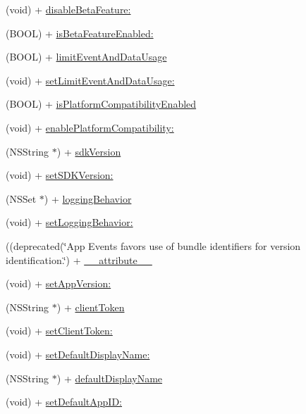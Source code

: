 \begin{DoxyCompactItemize}
(void) + \hyperlink{interfaceFBSettings_a6cc67de9d4b0069de4bfc6a3872f7114}{disable\+Beta\+Feature\+:}
\item 
(B\+O\+OL) + \hyperlink{interfaceFBSettings_a16d812cddbf44b8d354393d68757945f}{is\+Beta\+Feature\+Enabled\+:}
\item 
(B\+O\+OL) + \hyperlink{interfaceFBSettings_a3a939ba08bcff55d53c8e42f9a9e0234}{limit\+Event\+And\+Data\+Usage}
\item 
(void) + \hyperlink{interfaceFBSettings_ab0e8e19825a865db7cbf58da4957cf40}{set\+Limit\+Event\+And\+Data\+Usage\+:}
\item 
(B\+O\+OL) + \hyperlink{interfaceFBSettings_a257796e070b7f063dedaa95706946134}{is\+Platform\+Compatibility\+Enabled}
\item 
(void) + \hyperlink{interfaceFBSettings_a896c1bdd4227035fba49c90d06c101a2}{enable\+Platform\+Compatibility\+:}
\item 
(N\+S\+String $\ast$) + \hyperlink{interfaceFBSettings_a54528a8eee1469b7202d0e4825f08604}{sdk\+Version}
\item 
(void) + \hyperlink{interfaceFBSettings_afd9810381ac6027e6400879cb68ba46e}{set\+S\+D\+K\+Version\+:}
\item 
(N\+S\+Set $\ast$) + \hyperlink{interfaceFBSettings_a6fe525188c97270c4d4a6781c4d6ee11}{logging\+Behavior}
\item 
(void) + \hyperlink{interfaceFBSettings_aaaf513653d6a8e2d05e0ecea865155c0}{set\+Logging\+Behavior\+:}
\item 
((deprecated(\char`\"{}App Events favors use of bundle identifiers for version identification.\char`\"{}) + \hyperlink{interfaceFBSettings_a2e999eddc513423b7071f27bc09589aa}{\+\_\+\+\_\+attribute\+\_\+\+\_\+}
\item 
(void) + \hyperlink{interfaceFBSettings_a01b8ded28d0bc4e050ff6eccb9a03383}{set\+App\+Version\+:}
\item 
(N\+S\+String $\ast$) + \hyperlink{interfaceFBSettings_afa1e8342398ddbdd7e6e9cd0a28094ac}{client\+Token}
\item 
(void) + \hyperlink{interfaceFBSettings_a07cfc161668c190bf5fd37934821c4de}{set\+Client\+Token\+:}
\item 
(void) + \hyperlink{interfaceFBSettings_a783ff4cf8b998eadfbfe2d95efef24a1}{set\+Default\+Display\+Name\+:}
\item 
(N\+S\+String $\ast$) + \hyperlink{interfaceFBSettings_a64b1fe4c26086a1a2bb5b162815f2786}{default\+Display\+Name}
\item 
(void) + \hyperlink{interfaceFBSettings_aae75641f83b1caf710efd2ce72b6eb67}{set\+Default\+App\+I\+D\+:}

\end{DoxyCompactItemize}
